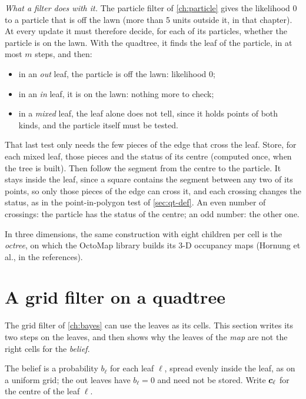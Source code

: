 \emph{What a filter does with it.} The particle filter of
\cref{ch:particle} gives the likelihood $0$ to a particle that is off the
lawn (more than 5 units outside it, in that chapter). At every update it
must therefore decide, for each of its particles, whether the particle is
on the lawn. With the quadtree, it finds the leaf of the particle, in at
most $m$ steps, and then:
\begin{itemize}[nosep]
  \item in an \emph{out} leaf, the particle is off the lawn: likelihood
        $0$;
  \item in an \emph{in} leaf, it is on the lawn: nothing more to check;
  \item in a \emph{mixed} leaf, the leaf alone does not tell, since it
        holds points of both kinds, and the particle itself must be
        tested.
\end{itemize}
That last test only needs the few pieces of the edge that cross the
leaf. Store, for each mixed leaf, those pieces and the status of its
centre (computed once, when the tree is built). Then follow the segment
from the centre to the particle. It stays inside the leaf, since a
square contains the segment between any two of its points, so only those
pieces of the edge can cross it, and each crossing changes the status,
as in the point-in-polygon test of \cref{sec:qt-def}. An even number of
crossings: the particle has the status of the centre; an odd number: the
other one.

In three dimensions, the same construction with eight children per cell
is the \emph{octree}, on which the OctoMap library builds its 3-D
occupancy maps (Hornung et al., in the references).

\section{A grid filter on a quadtree}
\label{sec:qt-filter}

The grid filter of \cref{ch:bayes} can use the leaves as its cells. This
section writes its two steps on the leaves, and then shows why the leaves
of the \emph{map} are not the right cells for the \emph{belief}.

The belief is a probability $b_\ell$ for each leaf $\ell$, spread evenly
inside the leaf, as on a uniform grid; the out leaves have $b_\ell=0$ and
need not be stored. Write $\bm{c}_\ell$ for the centre of the leaf
$\ell$.

